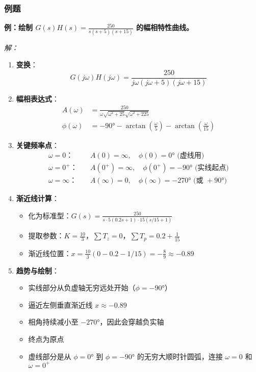 \subsubsection{例题}

\textbf{例：绘制 $G(s)H(s) = \frac{250}{s(s+5)(s+15)}$ 的幅相特性曲线。}

\textit{解：}
\begin{enumerate}
    \item \textbf{变换}：
    \[G(j\omega)H(j\omega) = \frac{250}{j\omega(j\omega+5)(j\omega+15)}\]
    
    \item \textbf{幅相表达式}：
    \begin{align*}
    A(\omega) &= \frac{250}{\omega\sqrt{\omega^2+25}\sqrt{\omega^2+225}} \\
    \phi(\omega) &= -90° - \arctan(\frac{\omega}{5}) - \arctan(\frac{\omega}{15})
    \end{align*}
    
    \item \textbf{关键频率点}：
    \begin{align*}
    \text{$\omega=0$：} \quad & A(0)=\infty, \quad \phi(0)=0° \text{ (虚线用)} \\
    \text{$\omega=0^+$：} \quad & A(0^+)=\infty, \quad \phi(0^+)=-90° \text{ (实线起点)} \\
    \text{$\omega=\infty$：} \quad & A(\infty)=0, \quad \phi(\infty)=-270° \text{ (或 }+90°\text{)}
    \end{align*}
    
    \item \textbf{渐近线计算}：
    \begin{itemize}
        \item 化为标准型：$G(s) = \frac{250}{s \cdot 5(0.2s+1) \cdot 15(s/15+1)}$
        \item 提取参数：$K=\frac{10}{3}$，$\sum T_z = 0$，$\sum T_p = 0.2 + \frac{1}{15}$
        \item 渐近线位置：$x = \frac{10}{3}(0 - 0.2 - 1/15) = -\frac{8}{9} \approx -0.89$
    \end{itemize}
    
    \item \textbf{趋势与绘制}：
    \begin{itemize}
        \item 实线部分从负虚轴无穷远处开始（$\phi=-90°$）
        \item 逼近左侧垂直渐近线 $x \approx -0.89$
        \item 相角持续减小至 $-270°$，因此会穿越负实轴
        \item 终点为原点
        \item 虚线部分是从 $\phi=0°$ 到 $\phi=-90°$ 的无穷大顺时针圆弧，连接 $\omega=0$ 和 $\omega=0^+$
    \end{itemize}
\end{enumerate}

